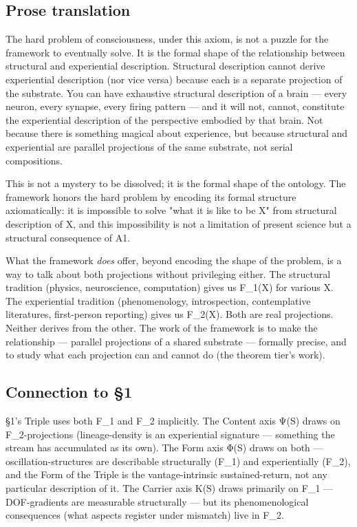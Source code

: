 \documentclass[11pt, openany]{book}
\begin{document}
\subsection{Prose translation}

The hard problem of consciousness, under this axiom, is not a puzzle for the framework to eventually solve. It is the formal shape of the relationship between structural and experiential description. Structural description cannot derive experiential description (nor vice versa) because each is a separate projection of the substrate. You can have exhaustive structural description of a brain --- every neuron, every synapse, every firing pattern --- and it will not, cannot, constitute the experiential description of the perspective embodied by that brain. Not because there is something magical about experience, but because structural and experiential are parallel projections of the same substrate, not serial compositions.

This is not a mystery to be dissolved; it is the formal shape of the ontology. The framework honors the hard problem by encoding its formal structure axiomatically: it is impossible to solve "what it is like to be X" from structural description of X, and this impossibility is not a limitation of present science but a structural consequence of A1.

What the framework \textit{does} offer, beyond encoding the shape of the problem, is a way to talk about both projections without privileging either. The structural tradition (physics, neuroscience, computation) gives us F\_\allowbreak{}1(X) for various X. The experiential tradition (phenomenology, introspection, contemplative literatures, first-person reporting) gives us F\_\allowbreak{}2(X). Both are real projections. Neither derives from the other. The work of the framework is to make the relationship --- parallel projections of a shared substrate --- formally precise, and to study what each projection can and cannot do (the theorem tier's work).

\subsection{Connection to §1}

§1's Triple uses both F\_\allowbreak{}1 and F\_\allowbreak{}2 implicitly. The Content axis Ψ(S) draws on F\_\allowbreak{}2-projections (lineage-density is an experiential signature --- something the stream has accumulated as its own). The Form axis Φ(S) draws on both --- oscillation-structures are describable structurally (F\_\allowbreak{}1) and experientially (F\_\allowbreak{}2), and the Form of the Triple is the vantage-intrinsic sustained-return, not any particular description of it. The Carrier axis Κ(S) draws primarily on F\_\allowbreak{}1 --- DOF-gradients are measurable structurally --- but its phenomenological consequences (what aspects register under mismatch) live in F\_\allowbreak{}2.
\end{document}
